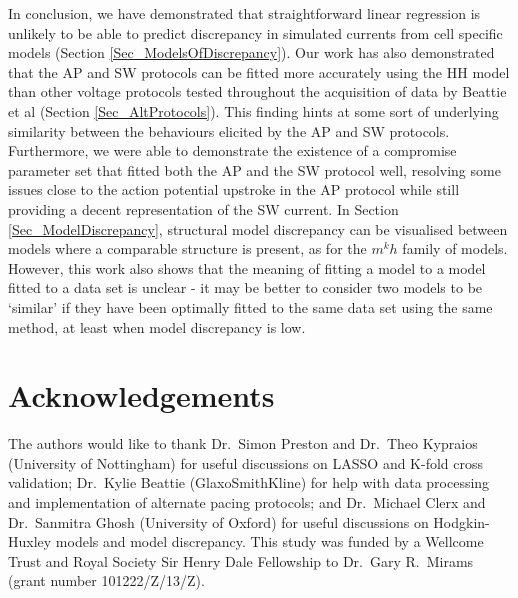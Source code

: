 \documentclass[11pt,a4paper,oneside]{article}
\begin{document}
In conclusion, we have demonstrated that straightforward linear regression is unlikely to be able to predict discrepancy in simulated currents from cell specific models (Section \ref{Sec_ModelsOfDiscrepancy}). Our work has also demonstrated that the AP and SW protocols can be fitted more accurately using the HH model than other voltage protocols tested throughout the acquisition of data by Beattie et al\cite{Beattie2018} (Section \ref{Sec_AltProtocols}). This finding hints at some sort of underlying similarity between the behaviours elicited by the AP and SW protocols. Furthermore, we were able to demonstrate the existence of a compromise parameter set that fitted both the AP and the SW protocol well, resolving some issues close to the action potential upstroke in the AP protocol while still providing a decent representation of the SW current. In Section \ref{Sec_ModelDiscrepancy}, structural model discrepancy can be visualised between models where a comparable structure is present, as for the $m^kh$ family of models. However, this work also shows that the meaning of fitting a model to a model fitted to a data set is unclear - it may be better to consider two models to be `similar' if they have been optimally fitted to the same data set using the same method, at least when model discrepancy is low.

\section{Acknowledgements}
The authors would like to thank Dr.~Simon Preston and Dr.~Theo Kypraios (University of Nottingham) for useful discussions on LASSO and K-fold cross validation; Dr.~Kylie Beattie (GlaxoSmithKline) for help with data processing and implementation of alternate pacing protocols; and Dr.~Michael Clerx and Dr.~Sanmitra Ghosh (University of Oxford) for useful discussions on Hodgkin-Huxley models and model discrepancy. This study was funded by a Wellcome Trust and Royal Society Sir Henry Dale Fellowship to Dr.~Gary R.~Mirams (grant number 101222/Z/13/Z).



\end{document}
